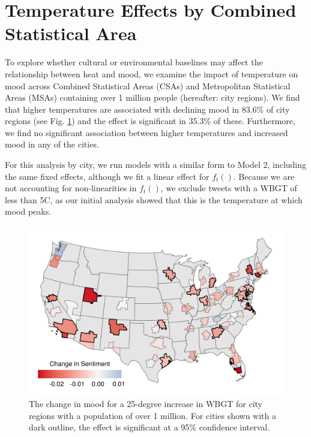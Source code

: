 \documentclass[9pt,twoside,lineno]{pnas-new}
\begin{document}
\newpage
\section*{Temperature Effects by Combined Statistical Area}
To explore whether cultural or environmental baselines may affect the relationship between heat and mood, we examine the impact of temperature on mood across Combined Statistical Areas (CSAs) and Metropolitan Statistical Areas (MSAs) containing over 1 million people (hereafter: city regions). We find that higher temperatures are associated with declining mood in 83.6\% of city regions (see Fig. \ref{fig:map}) and the effect is significant in 35.3\% of these. Furthermore, we find no significant association between higher temperatures and increased mood in any of the cities.

For this analysis by city, we run models with a similar form to Model 2, including the same fixed effects, although we fit a linear effect for $f_t()$.  Because we are not accounting for non-linearities in $f_t()$, we exclude tweets with a WBGT of less than 5\textdegree C, as our initial analysis showed that this is the temperature at which mood peaks.

\begin{figure}[H]
\centering
  \includegraphics[width=\linewidth]{../../../res/map_wbgt.png}
    \caption{The change in mood for a 25-degree increase in WBGT for city regions with a population of over 1 million.  For cities shown with a dark outline, the effect is significant at a 95\% confidence interval.}
  \label{fig:map}
\end{figure}

\newpage
\end{document}
